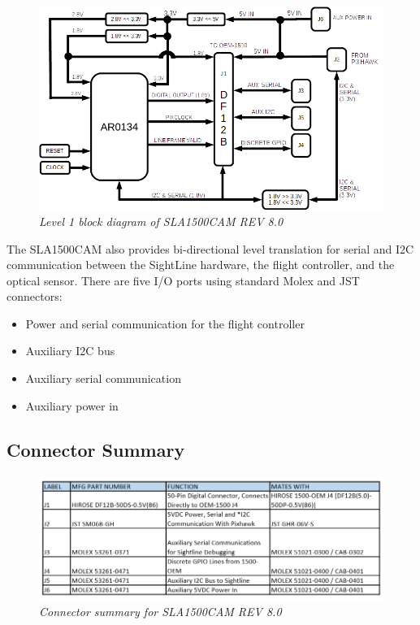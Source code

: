 \documentclass[11pt]{article}
\begin{document}
    \begin{figure}[H]
	\centering	
	\includegraphics[width=6 in]{LEVEL1_DIAGRAM_SCHEM_V2}
	\caption{\textit{Level 1 block diagram of SLA1500CAM REV 8.0}}	
	\end{figure}

The SLA1500CAM also provides bi-directional level translation for serial and I2C communication between the SightLine hardware, the flight controller, and the optical sensor. There are five I/O ports using standard Molex and JST connectors: 

\begin{itemize}

\item Power and serial communication for the flight controller
\item Auxiliary I2C bus
\item Auxiliary serial communication
\item Auxiliary power in 

\end{itemize}



\subsection{Connector Summary}

    \begin{figure}[H]
	\centering	
	\includegraphics[width=7 in]{SLA1500CAM_CONN_V3}
	\caption{\textit{Connector summary for SLA1500CAM REV 8.0}}	
	\end{figure}
\end{document}
